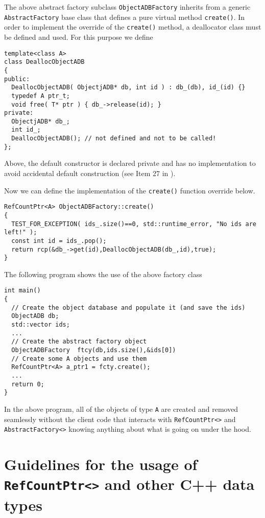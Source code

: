 The above abstract factory subclass {}\texttt{ObjectADBFactory}
inherits from a generic {}\texttt{AbstractFactory} base class that
defines a pure virtual method {}\texttt{create()}.  In order to
implement the override of the {}\texttt{create()} method, a
deallocator class must be defined and used.  For this purpose we
define

{\scriptsize\begin{verbatim}
template<class A>
class DeallocObjectADB
{
public:
  DeallocObjectADB( ObjectjADB* db, int id ) : db_(db), id_(id) {}
  typedef A ptr_t;
  void free( T* ptr ) { db_->release(id); }
private:
  ObjectjADB* db_;
  int id_;
  DeallocObjectADB(); // not defined and not to be called!
};
\end{verbatim}}

{}\noindent{}Above, the default constructor is declared private and
has no implementation to avoid accidental default construction (see
Item 27 in {}\cite{ref:meyers_1994}).

Now we can define the implementation of the {}\texttt{create()} function
override below.

{\scriptsize\begin{verbatim}
RefCountPtr<A> ObjectADBFactory::create()
{
  TEST_FOR_EXCEPTION( ids_.size()==0, std::runtime_error, "No ids are left!" );
  const int id = ids_.pop();
  return rcp(&db_->get(id),DeallocObjectADB(db_,id),true);
}
\end{verbatim}}

The following program shows the use of the above factory class

{\scriptsize\begin{verbatim}
int main()
{
  // Create the object database and populate it (and save the ids)
  ObjectADB db;
  std::vector ids;
  ...
  // Create the abstract factory object
  ObjectADBFactory  ftcy(db,ids.size(),&ids[0])
  // Create some A objects and use them
  RefCountPtr<A> a_ptr1 = fcty.create();
  ...
  return 0;
}
\end{verbatim}}

In the above program, all of the objects of type {}\texttt{A} are
created and removed seamlessly without the client code that interacts
with {}\texttt{Ref\-Count\-Ptr<>} and {}\texttt{AbstractFactory<>}
knowing anything about what is going on under the hood.

%
\section{Guidelines for the usage of {}\texttt{Ref\-Count\-Ptr<>} and other C++ data types}
%

